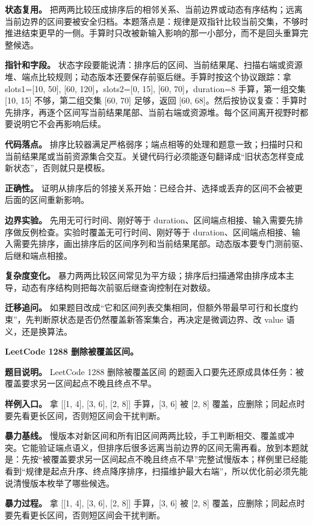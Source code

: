 \textbf{状态复用。} 把两两比较压成排序后的相邻关系、当前边界或动态有序结构；远离当前边界的区间要被安全归档。本题落点是：规律是双指针比较当前交集，不够时推进结束更早的一侧。手算时只改被新输入影响的那一小部分，而不是回头重算完整候选。

\textbf{指针和字段。} 状态字段要能说清：排序后的区间、当前结果尾、扫描右端或资源堆、端点比较规则；动态版本还要保存前驱后继。手算时按这个协议跟踪：拿 slots1=[10, 50], [60, 120]，slots2=[0, 15], [60, 70]，duration=8 手算，第一组交集 [10, 15] 不够，第二组交集 [60, 70] 足够，返回 [60, 68]。然后按协议复查：手算时先排序，再逐个区间写当前结果尾部、当前右端或资源堆。每个区间离开视野时都要说明它不会再影响后续。

\textbf{代码落点。} 排序比较器满足严格弱序；端点相等的处理和题意一致；扫描时只和当前结果尾或当前资源集合交互。关键代码行必须能逐句翻译成“旧状态怎样变成新状态”，否则就只是模板。

\textbf{正确性。} 证明从排序后的邻接关系开始：已经合并、选择或丢弃的区间不会被更后面的区间重新影响。

\textbf{边界实验。} 先用无可行时间、刚好等于 duration、区间端点相接、输入需要先排序做反例检查。实验时覆盖无可行时间、刚好等于 duration、区间端点相接、输入需要先排序，画出排序后的区间序列和当前结果尾部。动态版本要专门测前驱、后继和端点相接。

\textbf{复杂度变化。} 暴力两两比较区间常见为平方级；排序后扫描通常由排序成本主导，动态有序结构则把每次前驱后继查询控制在对数级。

\textbf{迁移追问。} 如果题目改成“它和区间列表交集相同，但额外带最早可行和长度约束”，先判断原状态是否仍然覆盖新答案集合，再决定是微调边界、改 value 语义，还是换算法。

\noindent\textbf{LeetCode 1288 删除被覆盖区间。}

\textbf{题目说明。} LeetCode 1288 删除被覆盖区间 的题面入口要先还原成具体任务：被覆盖要求另一区间起点不晚且终点不早。

\textbf{样例入口。} 拿 [[1, 4], [3, 6], [2, 8]] 手算，[3, 6] 被 [2, 8] 覆盖，应删除；同起点时要先看更长区间，否则短区间会干扰判断。

\textbf{暴力基线。} 慢版本对新区间和所有旧区间两两比较，手工判断相交、覆盖或冲突。它能验证端点语义，但排序后很多远离当前边界的区间无需再看。放到本题就是：先按“被覆盖要求另一区间起点不晚且终点不早”完整试慢版本；样例里已经能看到“规律是起点升序、终点降序排序，扫描维护最大右端”，所以优化前必须先能说清慢版本枚举了哪些候选。

\textbf{暴力过程。} 拿 [[1, 4], [3, 6], [2, 8]] 手算，[3, 6] 被 [2, 8] 覆盖，应删除；同起点时要先看更长区间，否则短区间会干扰判断。

